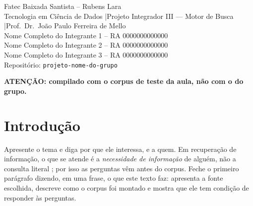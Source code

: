 \documentclass[
  article,
  12pt,
  oneside,
  a4paper,
  english,
  brazil
]{abntex2}\usepackage[]{graphicx}\usepackage[]{xcolor}
\newcommand{\nomecurso}{Tecnologia em Ciência de Dados}
\newcommand{\nomedisciplina}{Projeto Integrador III --- Motor de Busca}
\newcommand{\nomeprofessor}{Prof.\ Dr.\ João Paulo Ferreira de Mello}
\newcommand{\repositorio}{projeto-nome-do-grupo}
\newcommand{\integrantes}{%
  Nome Completo do Integrante 1 -- RA 0000000000000 \\
  Nome Completo do Integrante 2 -- RA 0000000000000 \\
  Nome Completo do Integrante 3 -- RA 0000000000000%
}
\begin{document}
\frenchspacing

\maketitle

\begin{center}
  \small
  Fatec Baixada Santista -- Rubens Lara \\
  \nomecurso{} \quad|\quad \nomedisciplina{} \quad|\quad \nomeprofessor{} \\[0.4em]
  \integrantes \\[0.4em]
  Repositório: \texttt{\repositorio}
\end{center}

\begin{center}\color{red}\textbf{ATEN\c{C}\~AO: compilado com o corpus de teste da aula, n\~ao com o do grupo.}\end{center}


\textual

\section{Introdução}

Apresente o tema e diga por que ele interessa, e a quem. Em recuperação de
informação, o que se atende é a \emph{necessidade de informação} de alguém, não
a consulta literal \cite[cap.~1]{manning2008}; por isso as perguntas vêm antes
do corpus. Feche o primeiro parágrafo dizendo, em uma frase, o que este texto
faz: apresenta a fonte escolhida, descreve como o corpus foi montado e mostra
que ele tem condição de responder às perguntas.

\end{document}
